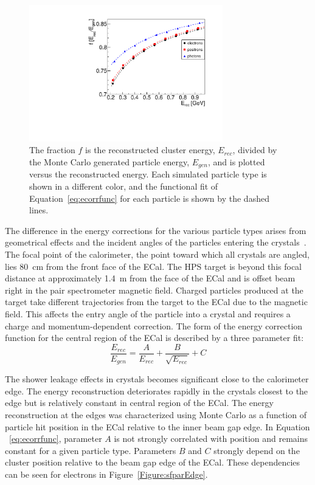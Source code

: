 \begin{figure}[thb]
  \centering
      \includegraphics[width=0.75\textwidth]{pics/performance/energycorrection.pdf}
  \caption[ECal energy shower correction functions derived from simulation]{The fraction $f$ is the reconstructed cluster energy, $E_{rec}$, divided by the Monte Carlo generated particle energy, $E_{gen}$, and is plotted versus the reconstructed energy. Each simulated particle type is shown in a different color, and the functional fit of Equation~\eqref{eq:ecorrfunc} for each particle is shown by the dashed lines.}
  \label{Figure:ecorr}
\end{figure}

The difference in the energy corrections for the various particle types arises from geometrical effects and the incident angles of the particles entering the crystals~\cite{szumila-vance_hps_ecal_2014}. The focal point of the calorimeter, the point toward which all crystals are angled, lies 80~cm from the front face of the ECal. The HPS target is beyond this focal distance at approximately 1.4~m from the face of the ECal and is offset beam right in the pair spectrometer magnetic field. Charged particles produced at the target take different trajectories from the target to the ECal due to the magnetic field. This affects the entry angle of the particle into a crystal and requires a charge and momentum-dependent correction. The form of the energy correction function for the central region of the ECal is described by a three parameter fit:\\

\begin{equation}
	\label{eq:ecorrfunc}
	\dfrac{E_{rec}}{E_{gen}} = \dfrac{A}{E_{rec}}+\dfrac{B}{\sqrt{E_{rec}}}+C 
\end{equation}

The shower leakage effects in crystals becomes significant close to the calorimeter edge. The energy reconstruction deteriorates rapidly in the crystals closest to the edge but is relatively constant in central region of the ECal. The energy reconstruction at the edges was characterized using Monte Carlo as a function of particle hit position in the ECal relative to the inner beam gap edge. In Equation ~\eqref{eq:ecorrfunc}, parameter $A$ is not strongly correlated with position and remains constant for a given particle type. Parameters $B$ and $C$  strongly depend on the cluster position relative to the beam gap edge of the ECal. These dependencies can be seen for electrons in Figure~\ref{Figure:sfparEdge}.

